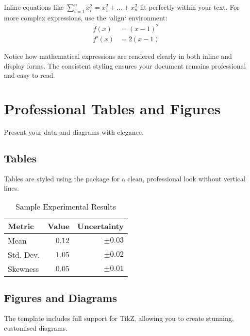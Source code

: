\documentclass[a4paper,11pt]{report}
\begin{document}
Inline equations like $\sum_{i=1}^n x_i^2 = x_1^2 + \dots + x_n^2$ fit perfectly within your text. For more complex expressions, use the `align` environment:
\begin{align}
    f(x) &= (x - 1)^2 \\
    f'(x) &= 2(x - 1)
\end{align}

\begin{notetbox}
    Notice how mathematical expressions are rendered clearly in both inline and display forms. The consistent styling ensures your document remains professional and easy to read.
\end{notetbox}

\section{Professional Tables and Figures}
Present your data and diagrams with elegance.

\subsection{Tables}
Tables are styled using the  package for a clean, professional look without vertical lines.

\begin{table}[h!]
    \centering
    \caption{Sample Experimental Results}
    \label{tab:results}
    \begin{tabular}{@{}lrr@{}}
        \toprule
        Metric    & Value     & Uncertainty \\
        \midrule
        Mean      & $0.12$    & $\pm 0.03$  \\
        Std. Dev. & $1.05$    & $\pm 0.02$  \\
        Skewness  & $0.05$    & $\pm 0.01$  \\
        \bottomrule
    \end{tabular}
\end{table}

\subsection{Figures and Diagrams}
The template includes full support for TikZ, allowing you to create stunning, customised diagrams.
\end{document}
